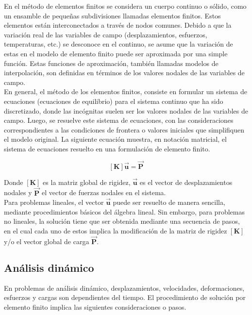 En el método de elementos finitos se considera un cuerpo continuo o sólido, como un ensamble de pequeñas subdivisiones llamadas elementos finitos. Estos elementos están interconectados a través de nodos comunes. Debido a que la variación real de las variables de campo (desplazamientos, esfuerzos, temperaturas, etc.) se desconoce en el continuo, se asume que la variación de estas en el modelo de elemento finito puede ser aproximada por una simple función. Estas funciones de aproximación, también llamadas modelos de interpolación, son definidas en términos de los valores nodales de las variables de campo.\\

En general, el método de los elementos finitos, consiste en formular un sistema de ecuaciones (ecuaciones de equilibrio) para el sistema continuo que ha sido discretizado, donde las incógnitas suelen ser los valores nodales de las variables de campo. Luego, se resuelve este sistema de ecuaciones, con las consideraciones correspondientes a las condiciones de frontera o valores iniciales que simplifiquen el modelo original. La siguiente ecuación muestra, en notación matricial, el sistema de ecuaciones resuelto en una formulación de elemento finito.

\begin{equation}
\bm{\left[K\right] \vec{u} = \vec{P}}
\end{equation}

Donde $\bm{[K]}$ es la matriz global de rigidez, $\bm{\vec{u}}$ es el vector de desplazamientos nodales y $\bm{\vec{P}}$ el vector de fuerzas nodales en el sistema.\\

Para problemas lineales, el vector $\bm{\vec{u}}$ puede ser resuelto de manera sencilla, mediante procedimientos básicos del álgebra lineal. Sin embargo, para problemas no lineales, la solución tiene que ser obtenida mediante una secuencia de pasos, en el cual cada uno de estos implica la modificación de la matriz de rigidez $\bm{[K]}$ y/o el vector global de carga $\bm{\vec{P}}$.

\subsection{Análisis dinámico}

En problemas de análisis dinámico, desplazamientos, velocidades, deformaciones, esfuerzos y cargas 
son dependientes del tiempo. El procedimiento de solución por elemento finito implica las siguientes 
consideraciones o pasos.\\

